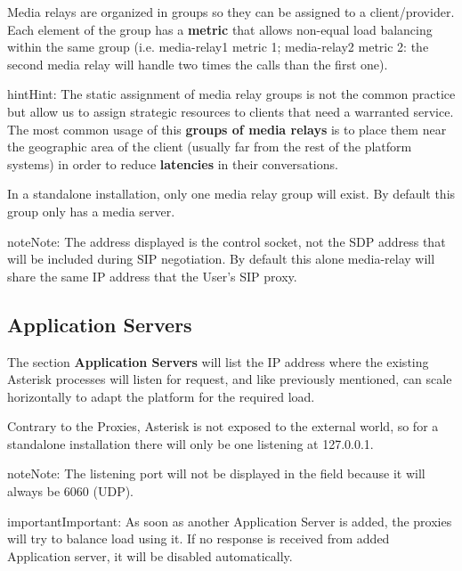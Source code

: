 \documentclass[letterpaper,10pt,english]{sphinxmanual}
\begin{document}
Media relays are organized in groups so they can be assigned to a client/provider. Each
element of the group has a \textbf{metric} that allows non-equal load balancing
within the same group (i.e. media-relay1 metric 1; media-relay2 metric 2:
the second media relay will handle two times the calls than the first one).

\begin{notice}{hint}{Hint:}
The static assignment of media relay groups is not the common practice
but allow us to assign strategic resources to clients that need a warranted
service. The most common usage of this \textbf{groups of media relays} is to
place them near the geographic area of the client (usually far from the
rest of the platform systems) in order to reduce \textbf{latencies} in their
conversations.
\end{notice}

In a standalone installation, only one media relay group will exist. By default this group only has a media server.

\begin{notice}{note}{Note:}
The address displayed is the control socket, not the SDP address that
will be included during SIP negotiation. By default this alone media-relay
will share the same IP address that the User's SIP proxy.
\end{notice}


\subsection{Application Servers}
\label{administration_portal/platform/infrastructure/application_servers::doc}\label{administration_portal/platform/infrastructure/application_servers:application-servers}
The section \textbf{Application Servers} will list the IP address where the existing
Asterisk processes will listen for request, and like previously mentioned,
can scale horizontally to adapt the platform for the required load.

Contrary to the Proxies, Asterisk is not exposed to the external world, so
for a standalone installation there will only be one listening at 127.0.0.1.

\begin{notice}{note}{Note:}
The listening port will not be displayed in the field because it will
always be 6060 (UDP).
\end{notice}

\begin{notice}{important}{Important:}
As soon as another Application Server is added, the proxies will
try to balance load using it. If no response is received from added
Application server, it will be disabled automatically.
\end{notice}
\end{document}
